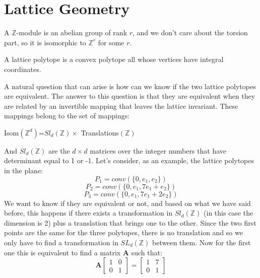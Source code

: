 
\chapter{Lattice Geometry}


A $\mathbb{Z}$-module is an abelian group of rank $r$, and we don't care about the torsion part, so it is isomorphic to $\mathbb{Z}^r$ for some $r$.
\begin{defn}
A lattice polytope is a convex polytope all whose vertices have integral coordinates.
\end{defn}
A natural question that can arise is how can we know if the two lattice polytopes are equivalent. The answer to this question is that they are equivalent when they are related by an invertible mapping that leaves the lattice invariant. These mappings belong to the set of mappings:
\begin{center}
Isom$(\mathbb{Z}^d)$=$Sl_d(\mathbb{Z})\times$ Translations$(\mathbb{Z})$
\end{center}
And $Sl_d(\mathbb{Z})$ are the $d\times d$ matrices over the integer numbers that have determinant equal to 1 or -1.
Let's consider, as an example, the lattice polytopes in the plane:
\begin{equation}
P_1=conv(\{0,e_1,e_2\})
\end{equation}
\begin{equation}
P_2=conv(\{0,e_1,7e_1+e_2\})
\end{equation}
\begin{equation}
P_3=conv(\{0,e_1,7e_1+2e_2\})
\end{equation}
We want to know if they are equivalent or not, and based on what we have said before, this happens if there exists a transformation in $Sl_d(\mathbb{Z})$ (in this case the dimension is 2) plus a translation that brings one to the other. Since the two first points are the same for the three polytopes, there is no translation and so we only have to find a transformation in $SL_d(\mathbb{Z})$ between them.
Now for the first one this is equivalent to find a matrix $\mathbf{A}$ such that:
\begin{equation}
\mathbf{A}\left[\begin{matrix}1&0\\0&1\end{matrix}\right]=\left[\begin{matrix}1&7\\0&1\end{matrix}\right]
\end{equation}
